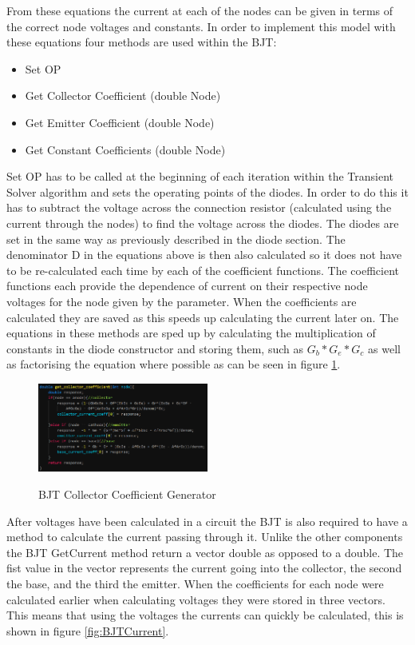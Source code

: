 \documentclass{article}
\begin{document}
From these equations the current at each of the nodes can be given in terms of the correct node voltages and constants. In order to implement this model with these equations four methods are used within the BJT:
\begin{itemize}
    \item Set OP
    \item Get Collector Coefficient (double Node)
    \item Get Emitter Coefficient (double Node)
    \item Get Constant Coefficients (double Node)
\end{itemize}
Set OP has to be called at the beginning of each iteration within the Transient Solver algorithm and sets the operating points of the diodes. In order to do this it has to subtract the voltage across the connection resistor (calculated using the current through the nodes) to find the voltage across the diodes. The diodes are set in the same way as previously described in the diode section. The denominator D in the equations above is then also calculated so it does not have to be re-calculated each time by each of the coefficient functions. The coefficient functions each provide the dependence of current on their respective node voltages for the node given by the parameter. When the coefficients are calculated they are saved as this speeds up calculating the current later on. The equations in these methods are sped up by calculating the multiplication of constants in the diode constructor and storing them, such as $G_b*G_e*G_c$ as well as factorising the equation where possible as can be seen in figure \ref{fig:BJTCollector}.    
\begin{figure}[h]
    \caption{BJT Collector Coefficient Generator}
    \centering
    \includegraphics[width=0.5\textwidth]{images/BJTCollector.png}
    \label{fig:BJTCollector}
\end{figure}
After voltages have been calculated in a circuit the BJT is also required to have a method to calculate the current passing through it. Unlike the other components the BJT GetCurrent method return a vector double as opposed to a double. The fist value in the vector represents the current going into the collector, the second the base, and the third the emitter. When the coefficients for each node were calculated earlier when calculating voltages they were stored in three vectors. This means that using the voltages the currents can quickly be calculated, this is shown in figure \ref{fig:BJTCurrent}. 
\end{document}
